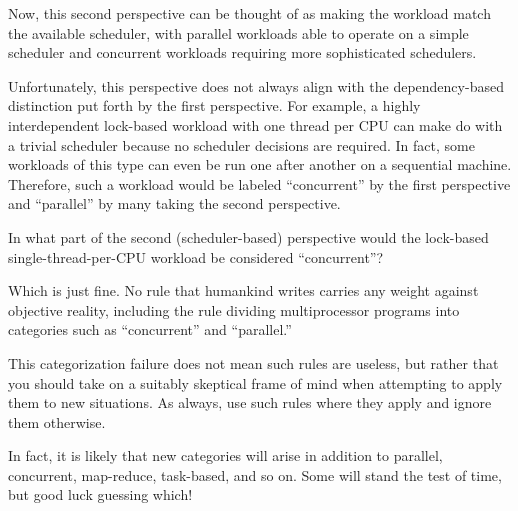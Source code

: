 Now, this second perspective can be thought of as making the workload
match the available scheduler, with parallel workloads able to
operate on a simple scheduler and concurrent workloads requiring
more sophisticated schedulers.

Unfortunately, this perspective does not always align with the
dependency-based distinction put forth by the first perspective.
For example, a highly interdependent lock-based workload
with one thread per CPU can make do with a trivial scheduler
because no scheduler decisions are required.
In fact, some workloads of this type can even be run one after another
on a sequential machine.
Therefore, such a workload would be labeled ``concurrent'' by the first
perspective and ``parallel'' by many taking the second perspective.

\QuickQuiz{}
	In what part of the second (scheduler-based) perspective would
	the lock-based single-thread-per-CPU workload be considered
	``concurrent''?
 \QuickQuizEnd

Which is just fine.
No rule that humankind writes carries any weight against objective
reality, including the rule dividing multiprocessor programs into
categories such as ``concurrent'' and ``parallel.''

This categorization failure does not mean such rules are useless,
but rather that you should take on a suitably skeptical frame of mind when
attempting to apply them to new situations.
As always, use such rules where they apply and ignore them otherwise.

In fact, it is likely that new categories will arise in addition
to parallel, concurrent, map-reduce, task-based, and so on.
Some will stand the test of time, but good luck guessing which!
